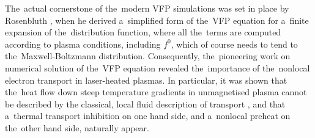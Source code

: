 
The~actual cornerstone of the~modern VFP simulations was set in place
by Rosenbluth \cite{Rosenbluth_PR1957}, when he derived a~simplified form 
of the~VFP equation for a~finite expansion of the~distribution function,
where all the~terms are computed according to plasma conditions, including
$f^0$, which of course needs to tend to the~Maxwell-Boltzmann distribution.
Consequently, the~pioneering work on numerical solution of the~VFP equation
\cite{Bell_1981_83, Matte_1982_86} revealed the~importance of the~nonlocal
electron transport in laser-heated plasmas. In particular, it was shown
that the~heat flow down steep temperature gradients in unmagnetised plasma
cannot be described by the classical, local fluid
description of transport \cite{SpitzerHarm_PR1953, Braginskii_1965_3}, 
and that a~thermal transport inhibition \cite{Bell_1981_83} on one hand side,
and a~nonlocal preheat on the~other hand side, naturally appear.



